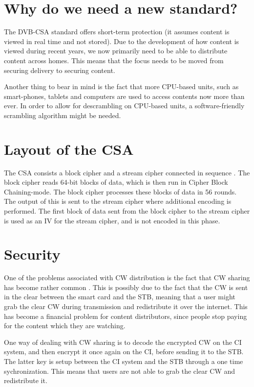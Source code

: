 \section{Why do we need a new standard?}
The DVB-CSA standard offers short-term protection (it assumes content 
is viewed in real time and not stored). Due to the development of how 
content is viewed during recent years, we now primarily need to be able 
to distribute content across homes. This means that the focus needs to 
be moved from securing delivery to securing content. \citep{Farncombe}

Another thing to bear in mind is the fact that more CPU-based units, 
such as smart-phones, tablets and computers are used to access contents 
now more than ever. In order to allow for descrambling on CPU-based 
units, a software-friendly scrambling algorithm might be needed.

\section{Layout of the CSA}
The CSA consists a block cipher and a stream cipher connected in 
sequence \citep[p. 271]{WeiLi:2007}. The block cipher reads 64-bit 
blocks of data, which is then run in Cipher Block Chaining-mode. The 
block cipher processes these blocks of data in 56 rounds. The output of 
this is sent to the stream cipher where additional encoding is 
performed. The first block of data sent from the block cipher to the 
stream cipher is used as an IV for the stream cipher, and is not 
encoded in this phase. \citep{DVBAnalysis:2006}

\section{Security}
One of the problems associated with CW distribution is the fact that CW 
sharing has become rather common \citep{Farncombe}. This is possibly 
due to the fact that the CW is sent in the clear between the smart card 
and the STB, meaning that a user might grab the clear CW during 
transmission and redistribute it over the internet. This has become a 
financial problem for content distributors, since people stop paying 
for the content which they are watching.

One way of dealing with CW sharing is to decode the encrypted CW on the 
CI system, and then encrypt it once again on the CI, before sending it 
to the STB. The latter key is setup between the CI system and the STB  
through a one time sychronization. This means that users are not able 
to grab the clear CW and redistribute it. \citep[pp. 12--13]{HIS:2011}

